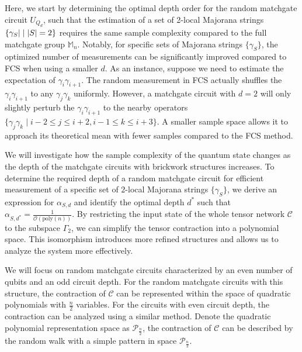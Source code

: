 \documentclass[showpacs,twocolumn,aps,prx,long bibliography,superscriptaddress,notitlepage]{revtex4-1}
\newcommand{\cbra}[1]{\{ #1 \}}
\newcommand{\Mbb}{\mathbb{M}}
\begin{document}
Here, we start by determining the optimal depth order for the random matchgate circuit $U_{Q_d}$, such that the estimation of a set of 2-local Majorana strings $\cbra{\gamma_S|\mid \abs{S}=2}$ requires the same sample complexity compared to the full matchgate group $\Mbb_n$. 
Notably, for specific sets of Majorana strings $\cbra{\gamma_S}$, the optimized number of measurements can be significantly improved compared to FCS when using a smaller $d$. 
As an instance, suppose we need to estimate the expectation of $\gamma_{i}\gamma_{i+1}$. The random measurement in FCS actually shuffles the $\gamma_{i}\gamma_{i+1}$ to any 
$\gamma_{j} \gamma_k$ uniformly. However, a matchgate circuit with $d=2$ will only slightly perturb the   $\gamma_{i}\gamma_{i+1}$ to the nearby operators $\{\gamma_{j}\gamma_{k} \mid i-2\leq j \leq i+2, i-1\leq k \leq i+3\}$. A smaller sample space allows it to approach its theoretical mean with fewer samples compared to the FCS method.

We will investigate how the sample complexity of the quantum state changes as the depth of the matchgate circuits with brickwork structures increases. To determine the required depth of a random matchgate circuit for efficient measurement of a specific set of $2$-local Majorana strings $\cbra{\gamma_S}$, we derive an expression for $\alpha_{S,d}$ and identify the optimal depth $d^\ast$ such that $\alpha_{S,d^\ast} = \frac{1}{\mathcal{O}(\mathrm{poly}(n))}$. 
By restricting the input state of the whole tensor network $\mathcal{C}$ to the subspace $\Gamma_2$, we can simplify the tensor contraction into a polynomial space. This isomorphism introduces more refined structures and allows us to analyze the system more effectively. 




We will focus on random matchgate circuits characterized by an even number of qubits and an odd circuit depth. For the random matchgate circuits with this structure, the contraction of $\mathcal{C}$ can be represented within the space of quadratic polynomials with $ \frac{n}{2} $ variables. For the circuits with even circuit depth, the contraction can be analyzed using a similar method. Denote the quadratic polynomial representation space as $\mathcal{P}_{\frac{n}{2}}$, the contraction of $\mathcal{C}$  can be described by the random walk with a simple pattern in space $\mathcal{P}_{\frac{n}{2}}$.
\end{document}
